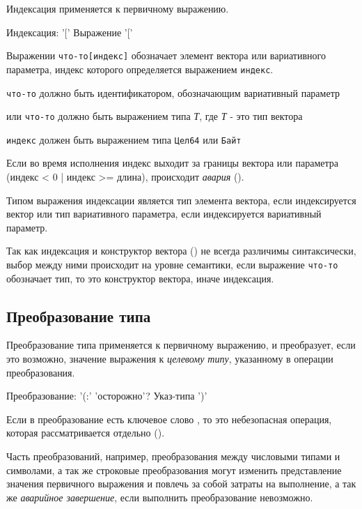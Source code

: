 Индексация применяется к первичному выражению.

\begin{Grammar}
Индексация: '[' Выражение '['
\end{Grammar}    

Выражении \verb|что-то[индекс]| обозначает элемент вектора или вариативного параметра, индекс которого определяется выражением \verb|индекс|.
\begin{d_itemize}
\item
    \verb|что-то| должно быть идентификатором, обозначающим вариативный параметр
\item
    или \verb|что-то| должно быть выражением типа \emph{Т}, где \emph{Т} - это тип вектора
\item
    \verb|индекс| должен быть выражением типа \verb|Цел64| или \verb|Байт|
\end{d_itemize}

Если во время исполнения индекс выходит за границы вектора или параметра (индекс < 0 | индекс >= длина), происходит \emph{авария} ().

Типом выражения индексации является тип элемента вектора, если индексируется вектор или тип вариативного параметра, если индексируется вариативный параметр.

Так как индексация и конструктор вектора () не всегда различимы синтаксически, выбор между ними происходит на уровне семантики, 
если выражение \verb|что-то|  обозначает тип, то это конструктор вектора, иначе индексация.

\hypertarget{conversion}{%
\subsection{Преобразование типа}\label{expr:conversion}}

Преобразование типа применяется к первичному выражению, и преобразует, если это возможно, значение выражения к \emph{целевому типу}, указанному в операции преобразования.

\begin{Grammar}
Преобразование: '(:' 'осторожно'? Указ-типа ')'
\end{Grammar}   

Если в преобразование есть ключевое слово , то это небезопасная операция, которая рассматривается отдельно ().

Часть преобразований, например, преобразования между числовыми типами и символами, а так же строковые преобразования могут изменить 
представление значения первичного выражения и повлечь за собой затраты на выполнение, а так же \emph{аварийное завершение}, если выполнить преобразование невозможно.

